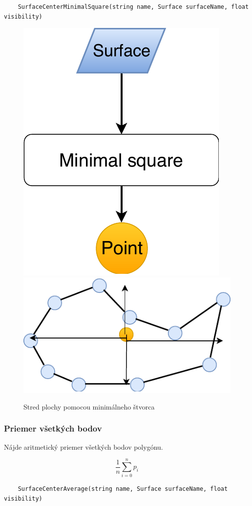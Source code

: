 \begin{lstlisting}
	SurfaceCenterMinimalSquare(string name, Surface surfaceName, float visibility)
\end{lstlisting}

\begin{figure}[H]
	\centering
	\includegraphics[height=0.3\textwidth]{obrazky-figures/Diagram/Point/DP Navrh operacii-0D - PointMiddle of surface.pdf}
	\includegraphics[height=0.3\textwidth]{obrazky-figures/Diagram/Draw/1Points/DP Navrh operacii-0D - PointMiddle of surface.pdf}
	\caption{Stred plochy pomocou minimálneho štvorca }
	\label{fig:1}
\end{figure}



\subsubsection{Priemer všetkých bodov}
Nájde aritmetický priemer všetkých bodov polygónu.

\begin{equation}
    \frac{1}{n} \sum_{i=0}^{n} p_i   
    \label{eq:aritPriemer}
\end{equation}
\begin{lstlisting}
	SurfaceCenterAverage(string name, Surface surfaceName, float visibility)
\end{lstlisting}


